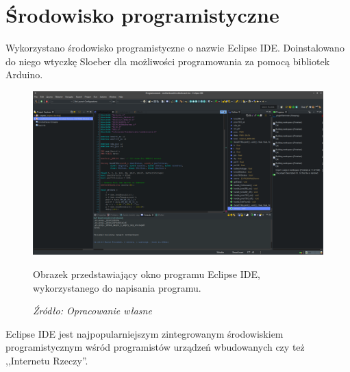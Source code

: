 \documentclass[12pt,a4paper,oneside]{memoir}
\begin{document}
\section{Środowisko programistyczne}
\par Wykorzystano środowisko programistyczne o nazwie Eclipse IDE. Doinstalowano do niego wtyczkę Sloeber dla możliwości programowania za pomocą bibliotek Arduino.
\begin{figure}[!h]
	\centering
	\includegraphics[scale=0.2]{images/eclipse.png}
	{\tytulyrozdzialow \footnotesize \caption[IDE - Okno programu] {Obrazek przedstawiający okno programu Eclipse IDE, wykorzystanego do napisania programu.}}
	\caption*{\textit{Źródło: Opracowanie własne}}
\end{figure}
\par Eclipse IDE jest najpopularniejszym zintegrowanym środowiskiem programistycznym wśród programistów urządzeń wbudowanych czy też ,,Internetu Rzeczy''.
\end{document}
